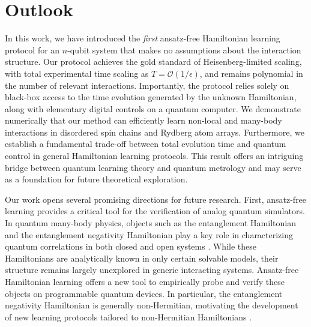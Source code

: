 \documentclass[twocolumn,superscriptaddress,aps,showpacs,amsmath,amstex,amssymb,citeautoscript,floatfix,pra,preprintnumbers]{revtex4-2}
\theoremstyle{plain}
\theoremstyle{plain}
\theoremstyle{plain}
\theoremstyle{plain}
\theoremstyle{plain}
\theoremstyle{plain}
\begin{document}
\section{Outlook}
In this work, we have introduced the \emph{first} ansatz-free Hamiltonian learning protocol for an $n$-qubit system that makes no assumptions about the interaction structure. Our protocol achieves the gold standard of Heisenberg-limited scaling, with total experimental time scaling as $T=\mathcal{O}(1/\epsilon)$, and remains polynomial in the number of relevant interactions. Importantly, the protocol relies solely on black-box access to the time evolution generated by the unknown Hamiltonian, along with elementary digital controls on a quantum computer. We demonstrate numerically that our method can efficiently learn non-local and many-body interactions in disordered spin chains and Rydberg atom arrays. Furthermore, we establish a fundamental trade-off between total evolution time and quantum control in general Hamiltonian learning protocols. This result offers an intriguing bridge between quantum learning theory and quantum metrology and may serve as a foundation for future theoretical exploration.



Our work opens several promising directions for future research. First, ansatz-free learning provides a critical tool for the verification of analog quantum simulators. In quantum many-body physics, objects such as the entanglement Hamiltonian and the entanglement negativity Hamiltonian play a key role in characterizing quantum correlations in both closed and open systems \cite{EntanglementHamiltonianLearning,Cardy_2016,EntanglementHamiltonianReview,NegativityHamiltonian,2025arXiv250609561T}. While these Hamiltonians are analytically known in only certain solvable models, their structure remains largely unexplored in generic interacting systems. Ansatz-free Hamiltonian learning offers a new tool to empirically probe and verify these objects on programmable quantum devices. In particular, the entanglement negativity Hamiltonian is generally non-Hermitian, motivating the development of new learning protocols tailored to non-Hermitian Hamiltonians \cite{PhysRevB.110.235113}.
\end{document}
